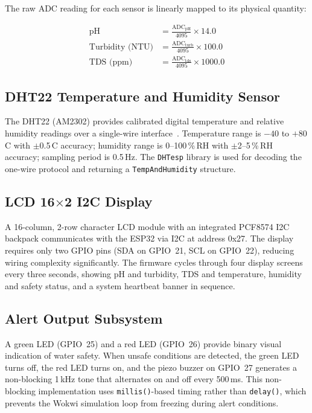 \documentclass[12pt,a4paper]{article}
\begin{document}
The raw ADC reading for each sensor is linearly mapped to its
physical quantity:

\begin{align}
\text{pH} &= \frac{\text{ADC}_\text{pH}}{4095} \times 14.0 \label{eq:ph}\\
\text{Turbidity (NTU)} &= \frac{\text{ADC}_\text{turb}}{4095} \times 100.0 \label{eq:turb}\\
\text{TDS (ppm)} &= \frac{\text{ADC}_\text{tds}}{4095} \times 1000.0 \label{eq:tds}
\end{align}

\subsection{DHT22 Temperature and Humidity Sensor}

The DHT22 (AM2302) provides calibrated digital temperature and
relative humidity readings over a single-wire interface~\cite{dht22ds2020}.
Temperature range is $-40$ to $+80$\,\textdegree C with
$\pm$0.5\,\textdegree C accuracy; humidity range is 0--100\,\%\,RH
with $\pm$2--5\,\%\,RH accuracy; sampling period is 0.5\,Hz.
The \texttt{DHTesp} library is used for decoding the one-wire
protocol and returning a \texttt{TempAndHumidity} structure.

\subsection{LCD 16$\times$2 I2C Display}

A 16-column, 2-row character LCD module with an integrated
PCF8574 I2C backpack communicates with the ESP32 via I2C at
address 0x27. The display requires only two GPIO pins (SDA on
GPIO~21, SCL on GPIO~22), reducing wiring complexity
significantly. The firmware cycles through four display screens
every three seconds, showing pH and turbidity, TDS and
temperature, humidity and safety status, and a system heartbeat
banner in sequence.

\subsection{Alert Output Subsystem}

A green LED (GPIO~25) and a red LED (GPIO~26) provide binary
visual indication of water safety. When unsafe conditions are
detected, the green LED turns off, the red LED turns on, and the
piezo buzzer on GPIO~27 generates a non-blocking 1\,kHz tone that
alternates on and off every 500\,ms. This non-blocking implementation
uses \texttt{millis()}-based timing rather than \texttt{delay()},
which prevents the Wokwi simulation loop from freezing during
alert conditions.
\end{document}

